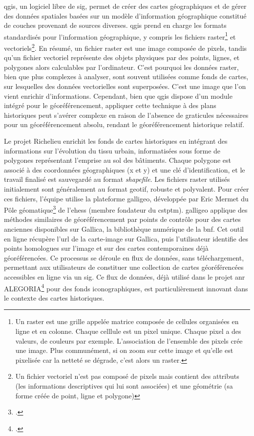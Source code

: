 \acrshort{qgis}, un logiciel libre de \acrshort{sig}, permet de créer des cartes géographiques et de gérer des données spatiales basées sur un modèle d'information géographique constitué de couches provenant de sources diverses. \acrshort{qgis} prend en charge les formats standardisés pour l'information géographique, y compris les fichiers raster\footnote{Un raster est une grille appelée matrice composée de cellules organisées en ligne et en colonne. Chaque celllule est un pixel unique. Chaque pixel a des valeurs, de couleurs par exemple. L'association de l'ensemble des pixels crée une image. Plus communément, si on zoom sur cette image et qu'elle est pixelisée car la netteté se dégrade, c'est alors un raster.} et vectoriels\footnote{Un fichier vectoriel n'est pas composé de pixels mais contient des attributs (les informations descriptives qui lui sont associées) et une géométrie (sa forme créée de point, ligne et polygone)}. En résumé, un fichier raster est une image composée de pixels, tandis qu'un fichier vectoriel représente des objets physiques par des points, lignes, et polygones alors calculables par l'ordinateur. C'est pourquoi les données raster, bien que plus complexes à analyser, sont souvent utilisées comme fonds de cartes, sur lesquelles des données vectorielles sont superposées. C'est une image que l'on vient enrichir d'informations. Cependant, bien que \acrshort{qgis} dispose d'un module intégré pour le géoréférencement, appliquer cette technique à des plans historiques peut s'avérer complexe en raison de l'absence de graticules nécessaires pour un géoréférencement absolu, rendant le géoréférencement historique relatif.

Le projet Richelieu enrichit les fonds de cartes historiques en intégrant des informations sur l'évolution du tissu urbain, informatisées sous forme de polygones représentant l'emprise au sol des bâtiments. Chaque polygone est associé à des coordonnées géographiques (x et y) et une clé d'identification, et le travail finalisé est sauvegardé au format \textit{shapefile}. Les fichiers raster utilisés initialement sont généralement au format \acrshort{geotif}, robuste et polyvalent. Pour créer ces fichiers, l'équipe utilise la plateforme \acrshort{galligeo}, développée par Eric Mermet du Pôle géomatique\footcite{ALPAGEGlossaire2024} de l’\acrshort{ehess} (membre fondateur du \acrshort{cstptm}). \acrshort{galligeo} applique des méthodes similaires de géoréférencement par points de contrôle pour des cartes anciennes disponibles sur Gallica, la bibliothèque numérique de la \acrshort{bnf}. Cet outil en ligne récupère l’\acrshort{url} de la carte-image sur Gallica, puis l'utilisateur identifie des points homologues sur l'image et sur des cartes contemporaines déjà géoréférencées. Ce processus se déroule en flux de données, sans téléchargement, permettant aux utilisateurs de constituer une collection de cartes géoréférencées accessibles en ligne via un \acrshort{sig}. Ce flux de données, déjà utilisé dans le projet \acrshort{anr} ALEGORIA\footcite{ENSG-GEOMATIQUEIGNProjet2022} pour des fonds iconographiques, est particulièrement innovant dans le contexte des cartes historiques.

